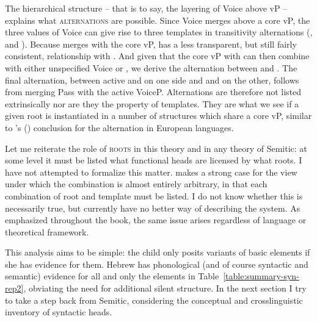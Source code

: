 \begin{exe}
\begin{xlist}
\begin{xlist}
\begin{xlist}
\begin{xlist}
\begin{xlist}
\begin{xlist}
\begin{exe}
\begin{xlist}
\begin{exe}
\begin{exe}
\begin{xlist}
\begin{exe}
The hierarchical structure -- that is to say, the layering of Voice above vP -- explains what \textsc{alternations} are possible. Since Voice merges above a core vP, the three values of Voice can give rise to three templates in transitivity alternations ({\tkal}, {\tnif} and {\thif}). Because {\va} merges with the core vP, {\tpie} has a less transparent, but still fairly consistent, relationship with {\tkal}. And given that the core vP with {\va} can then combine with either unspecified Voice or {\vz}, we derive the alternation between {\tpie} and {\thit}. The final alternation, between active {\tpie} and {\thif} on one side and  {\tpua} and {\thuf} on the other, follows from merging Pass with the active VoiceP. Alternations are therefore not listed extrinsically nor are they the property of templates. They are what we see if a given root is instantiated in a number of structures which share a core vP, similar to \citeauthor{schaefer08}'s (\citeyear{schaefer08}) conclusion for the  alternation in European languages.

Let me reiterate the role of \textsc{roots} in this theory and in any theory of Semitic: at some level it must be listed what functional heads are licensed by what roots. I have not attempted to formalize this matter. \cite{arad05} makes a strong case for the view under which the combination is almost entirely arbitrary, in that each combination of root and template must be listed. I do not know whether this is necessarily true, but currently have no better way of describing the system. As emphasized throughout the book, the same issue arises regardless of language or theoretical framework.

This analysis aims to be simple: the child only posits variants of basic elements if she has evidence for them. Hebrew has phonological (and of course syntactic and semantic) evidence for all and only the elements in Table~\ref{table:summary-syn-rep2}, obviating the need for additional silent structure. In the next section I try to take a step back from Semitic, considering the conceptual and crosslinguistic inventory of syntactic heads.



\end{exe}
\end{xlist}
\end{exe}
\end{exe}
\end{xlist}
\end{exe}
\end{xlist}
\end{xlist}
\end{xlist}
\end{xlist}
\end{xlist}
\end{xlist}
\end{exe}
